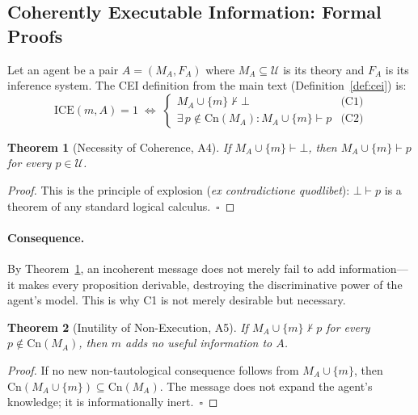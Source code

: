 \documentclass{article}
\newcommand{\Univ}{\mathcal{U}}
\newcommand{\ICE}{\mathrm{ICE}}
\newcommand{\MA}{M_A}
\newtheorem{theorem}{Theorem}
\begin{document}
\subsection{Coherently Executable Information: Formal Proofs}
\label{app:cei-proofs}

Let an agent be a pair $A = (\MA, F_A)$ where $\MA \subseteq \Univ$ is its
theory and $F_A$ is its inference system.  The CEI definition from the main
text (Definition~\ref{def:cei}) is:
\[
  \ICE(m, A) = 1 \;\iff\;
  \begin{cases}
    \MA \cup \{m\} \nvdash \bot & \text{(C1)} \\
    \exists\, p \notin \mathrm{Cn}(\MA) : \MA \cup \{m\} \vdash p & \text{(C2)}
  \end{cases}
\]

\begin{theorem}[Necessity of Coherence, A4]
\label{thm:explosion}
If $\MA \cup \{m\} \vdash \bot$, then $\MA \cup \{m\} \vdash p$ for every
$p \in \Univ$.
\end{theorem}

\begin{proof}
This is the principle of explosion (\emph{ex contradictione quodlibet}):
$\bot \vdash p$ is a theorem of any standard logical calculus.~$\square$
\end{proof}

\paragraph{Consequence.}
By Theorem~\ref{thm:explosion}, an incoherent message does not merely fail to
add information---it makes every proposition derivable, destroying the
discriminative power of the agent's model.  This is why C1 is not merely
desirable but necessary.

\begin{theorem}[Inutility of Non-Execution, A5]
\label{thm:inutility}
If $\MA \cup \{m\} \nvdash p$ for every $p \notin \mathrm{Cn}(\MA)$, then $m$
adds no useful information to $A$.
\end{theorem}

\begin{proof}
If no new non-tautological consequence follows from $\MA \cup \{m\}$, then
$\mathrm{Cn}(\MA \cup \{m\}) \subseteq \mathrm{Cn}(\MA)$.  The message does
not expand the agent's knowledge; it is informationally inert.~$\square$
\end{proof}
\end{document}
